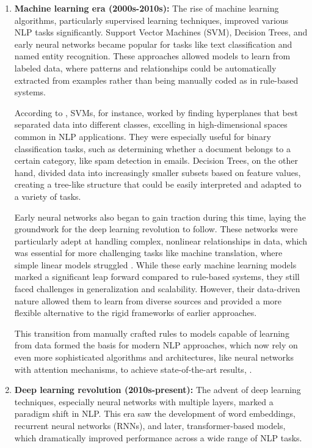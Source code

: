 \begin{enumerate}
    \item \textbf{Machine learning era (2000s-2010s):} The rise of machine learning algorithms, particularly supervised learning techniques, improved various NLP tasks significantly. Support Vector Machines (SVM), Decision Trees, and early neural networks became popular for tasks like text classification and named entity recognition. These approaches allowed models to learn from labeled data, where patterns and relationships could be automatically extracted from examples rather than being manually coded as in rule-based systems.

According to \cite{mi2016supervised}, SVMs, for instance, worked by finding hyperplanes that best separated data into different classes, excelling in high-dimensional spaces common in NLP applications. They were especially useful for binary classification tasks, such as determining whether a document belongs to a certain category, like spam detection in emails. Decision Trees, on the other hand, divided data into increasingly smaller subsets based on feature values, creating a tree-like structure that could be easily interpreted and adapted to a variety of tasks.

Early neural networks also began to gain traction during this time, laying the groundwork for the deep learning revolution to follow. These networks were particularly adept at handling complex, nonlinear relationships in data, which was essential for more challenging tasks like machine translation, where simple linear models struggled \cite{conneau2017supervised}. While these early machine learning models marked a significant leap forward compared to rule-based systems, they still faced challenges in generalization and scalability. However, their data-driven nature allowed them to learn from diverse sources and provided a more flexible alternative to the rigid frameworks of earlier approaches.

This transition from manually crafted rules to models capable of learning from data formed the basis for modern NLP approaches, which now rely on even more sophisticated algorithms and architectures, like neural networks with attention mechanisms, to achieve state-of-the-art results\cite{mi2016supervised}, \cite{conneau2017supervised}.
    
    \item \textbf{Deep learning revolution (2010s-present):} The advent of deep learning techniques, especially neural networks with multiple layers, marked a paradigm shift in NLP. This era saw the development of word embeddings, recurrent neural networks (RNNs), and later, transformer-based models, which dramatically improved performance across a wide range of NLP tasks.


\end{enumerate}
